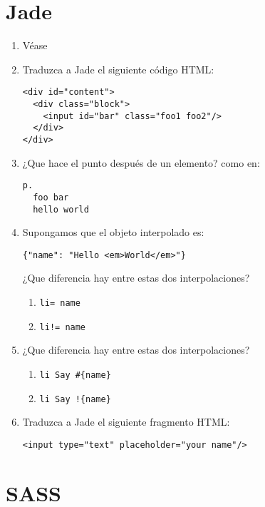 \documentclass[spanish,a4paper,11pt]{article}
\begin{document}
\section{Jade}
\begin{enumerate}
\item 
Véase 
\item Traduzca a Jade el siguiente código HTML:
\begin{verbatim}
<div id="content">
  <div class="block">
    <input id="bar" class="foo1 foo2"/>
  </div>
</div>
\end{verbatim}
\item 
¿Que hace el punto después de un elemento? como en:
\begin{verbatim}
p.
  foo bar
  hello world
\end{verbatim}
\item 
Supongamos que el objeto interpolado es:
\begin{verbatim}
{"name": "Hello <em>World</em>"}
\end{verbatim}
¿Que diferencia hay entre estas dos interpolaciones?
\begin{enumerate}
\item 
\verb|li= name| %
\item 
\verb|li!= name| %
\end{enumerate}
\item 
¿Que diferencia hay entre estas dos interpolaciones?

\begin{enumerate}
\item 
\verb|li Say #{name}| %
\item 
\verb|li Say !{name}| %
\end{enumerate}
\item 
Traduzca a Jade el siguiente fragmento HTML:
\begin{verbatim}
<input type="text" placeholder="your name"/>
\end{verbatim}
\end{enumerate}

\section{SASS}
\end{document}
